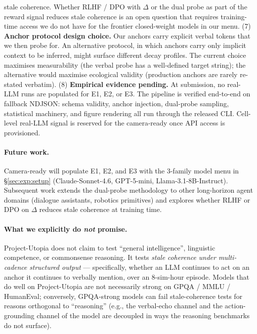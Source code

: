 stale coherence. Whether RLHF / DPO with $\Delta$ or the dual
probe as part of the reward signal reduces stale coherence is
an open question that requires training-time access we do not
have for the frontier closed-weight models in our menu.
(7) \textbf{Anchor protocol design choice.} Our anchors carry
explicit verbal tokens that we then probe for. An alternative
protocol, in which anchors carry only implicit context to be
inferred, might surface different decay profiles. The current
choice maximises measurability (the verbal probe has a
well-defined target string); the alternative would maximise
ecological validity (production anchors are rarely re-stated
verbatim).
(8) \textbf{Empirical evidence pending.} At submission, no
real-LLM runs are populated for E1, E2, or E3. The pipeline is
verified end-to-end on fallback NDJSON: schema validity, anchor
injection, dual-probe sampling, statistical machinery, and
figure rendering all run through the released CLI. Cell-level
real-LLM signal is reserved for the camera-ready once API
access is provisioned.

\paragraph{Future work.}
Camera-ready will populate E1, E2, and E3 with the 3-family model
menu in \S\ref{sec:exp:setup}
(Claude-Sonnet-4.6, GPT-5-mini, Llama-3.1-8B-Instruct).
Subsequent work extends the dual-probe methodology to other
long-horizon agent domains (dialogue assistants, robotics
primitives) and explores whether RLHF or DPO on $\Delta$
reduces stale coherence at training time.

\paragraph{What we explicitly do \emph{not} promise.}
Project-Utopia does not claim to test ``general intelligence'',
linguistic competence, or commonsense reasoning. It tests
\emph{stale coherence under multi-cadence structured output} ---
specifically, whether an LLM continues to act on an anchor it
continues to verbally mention, over an 8-sim-hour episode. Models
that do well on Project-Utopia are not necessarily strong on
GPQA / MMLU / HumanEval; conversely, GPQA-strong models can fail
stale-coherence tests for reasons orthogonal to ``reasoning''
(e.g., the verbal-echo channel and the action-grounding channel
of the model are decoupled in ways the reasoning benchmarks do
not surface).
